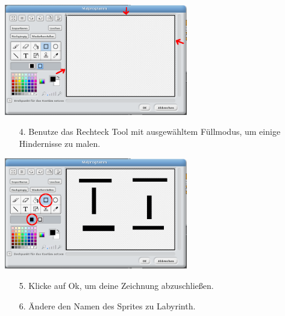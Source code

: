 \includegraphics[width=0.6\textwidth]{images/aufgabe2_rechteck_gross.png}
\begin{itemize}
\item[4.] Benutze das Rechteck Tool mit ausgewähltem Füllmodus, um einige Hindernisse zu malen.
\end{itemize}
\includegraphics[width=0.6\textwidth]{images/aufgabe2_labyrinth.png}
\begin{itemize}
\item[5.] Klicke auf Ok, um deine Zeichnung abzuschließen.
\item[6.] Ändere den Namen des Sprites zu Labyrinth.
\end{itemize}

